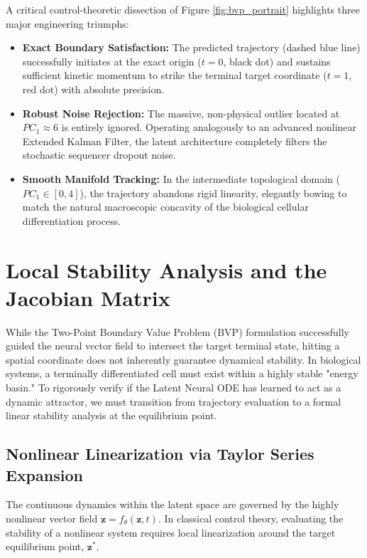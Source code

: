 \documentclass[12pt, a4paper]{article}
\begin{document}
	A critical control-theoretic dissection of Figure \ref{fig:bvp_portrait} highlights three major engineering triumphs:
	\begin{itemize}
		\item \textbf{Exact Boundary Satisfaction:} The predicted trajectory (dashed blue line) successfully initiates at the exact origin ($t=0$, black dot) and sustains sufficient kinetic momentum to strike the terminal target coordinate ($t=1$, red dot) with absolute precision.
		\item \textbf{Robust Noise Rejection:} The massive, non-physical outlier located at $PC_1 \approx 6$ is entirely ignored. Operating analogously to an advanced nonlinear Extended Kalman Filter, the latent architecture completely filters the stochastic sequencer dropout noise.
		\item \textbf{Smooth Manifold Tracking:} In the intermediate topological domain ($PC_1 \in [0, 4]$), the trajectory abandons rigid linearity, elegantly bowing to match the natural macroscopic concavity of the biological cellular differentiation process.
	\end{itemize}
	
	\section{Local Stability Analysis and the Jacobian Matrix}
	
	While the Two-Point Boundary Value Problem (BVP) formulation successfully guided the neural vector field to intersect the target terminal state, hitting a spatial coordinate does not inherently guarantee dynamical stability. In biological systems, a terminally differentiated cell must exist within a highly stable "energy basin." To rigorously verify if the Latent Neural ODE has learned to act as a dynamic attractor, we must transition from trajectory evaluation to a formal linear stability analysis at the equilibrium point.
	
	\subsection{Nonlinear Linearization via Taylor Series Expansion}
	The continuous dynamics within the latent space are governed by the highly nonlinear vector field $\dot{\mathbf{z}} = f_\theta(\mathbf{z}, t)$. In classical control theory, evaluating the stability of a nonlinear system requires local linearization around the target equilibrium point, $\mathbf{z}^*$. 
	
\end{document}
